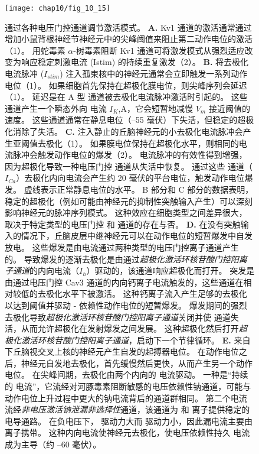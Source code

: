 \begin{figure}[htbp]
	\centering
	\texttt{[image: chap10/fig\_10\_15]}
	\caption{通过各种电压门控通道调节激活模式。
		\textbf{A.} Kv1 通道的激活通常通过增加小鼠背根神经节神经元中的尖峰阈值来阻止第二动作电位的激活（1）。
		用蛇毒素 $\alpha$-树毒素阻断 Kv1 通道可将激发模式从强烈适应改变为响应稳定刺激电流 (Istim) 的持续重复激发（2）。
		\textbf{B.} 将去极化电流脉冲 ($I_{stim}$) 注入孤束核中的神经元通常会立即触发一系列动作电位（1）。
		如果细胞首先保持在超极化膜电位，则尖峰序列会延迟（1）。
		延迟是在 A 型  通道被去极化电流脉冲激活时引起的。
		这些通道产生一个瞬态外向  电流 $I_K$,A，它会短暂地减慢 $V_m$ 接近阈值的速度。
		这些通道通常在静息电位（–55 毫伏）下失活，但稳定的超极化消除了失活\cite{dekin1987vitro}。
		\textbf{C.} 注入静止的丘脑神经元的小去极化电流脉冲会产生亚阈值去极化（1）。
		如果膜电位保持在超极化水平，则相同的电流脉冲会触发动作电位的爆发（2）。
		电流脉冲的有效性得到增强，因为超极化导致一种电压门控  通道从失活中恢复。
		通过这些  通道（$I_{Ca}$）去极化内向电流会产生约 20 毫伏的平台电位，触发动作电位爆发。
		虚线表示正常静息电位的水平\cite{llinas1982electrophysiology}。
		B 部分和 C 部分的数据表明，稳定的超极化（例如可能由神经元的抑制性突触输入产生）可以深刻影响神经元的脉冲序列模式。
		这种效应在细胞类型之间差异很大，取决于特定类型的电压门控  和  通道的存在与否。
		\textbf{D.} 在没有突触输入的情况下，丘脑皮层中继神经元可以在动作电位的短暂爆发中自发放电。
		这些爆发是由电流通过两种类型的电压门控离子通道产生的。
		导致爆发的逐渐去极化是由通过\textit{超极化激活环核苷酸门控阳离子通道}的内向电流（$I_h$）驱动的，该通道响应超极化而打开。
		突发是由通过电压门控 Cav3 通道的内向钙离子电流触发的，这些通道在相对较低的去极化水平下被激活。
		这种钙离子流入产生足够的去极化以达到阈值并驱动 - 依赖性动作电位的短暂爆发。
		爆发期间的强烈去极化导致\textit{超极化激活环核苷酸门控阳离子通道}关闭并使  通道失活，从而允许超极化在发射爆发之间发展。
		这种超极化然后打开\textit{超极化激活环核苷酸门控阳离子通道}，启动下一个节律循环\cite{mccormick1992model}。
		\textbf{E.} 来自下丘脑视交叉上核的神经元产生自发的起搏器电位。
		在动作电位之后，神经元自发地去极化，首先缓慢然后更快，从而产生另一个动作电位。
		在尖峰间期，去极化由两个内向的  电流驱动。
		一种是“持续的  电流”，它流经对河豚毒素阻断敏感的电压依赖性钠通道，可能与动作电位上升过程中更大的钠电流背后的通道群相同。
		第二个电流流经\textit{非电压激活钠泄漏非选择性}通道，该通道为  和  离子提供稳定的电导通路。
		在负电压下， 驱动力大而  驱动力小，因此漏电流主要由  离子携带。
		这种内向电流使神经元去极化，使电压依赖性持久  电流成为主导（约 –60 毫伏）\cite{jackson2004mechanism}。}
	\label{fig:10_15}
\end{figure}


